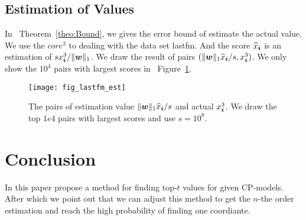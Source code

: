 \documentclass[letterpaper]{article}
\newcommand{\V}[1]{{\bm{{\MakeLowercase{#1}}}}}
\newcommand{\norm}[2]{\|#1\|_{#2}}
\newcommand{\Fig}[1]   {Figure~\ref{fig:#1}}
\newcommand{\Theo}[1] {Theorem~\ref{theo:#1}}
\begin{document}
\subsection{Estimation of Values}
In ~\Theo{Bound}, we gives the error bound of estimate the actual value.
We use the $core^3$ to dealing with the data set lastfm.
And the score $\widehat{x}_{\V{i}}$ is an estimation of $sx^3_{\V{i}}/\norm{\V{w}}{1}$.
We draw the result of pairs $(\norm{\V{w}}{1}\widehat{x}_{\V{i}}/s,x^3_{\V{i}})$.
We only show the $10^4$ pairs with largest scores in ~\Fig{Est}.
\begin{figure}[ht]
  \centering
  \texttt{[image: fig\_lastfm\_est]}\\
  \caption{The pairs of estimation value $\norm{\V{w}}{1}\widehat{x}_{\V{i}}/s$ and actual $x^3_{\V{i}}$.
           We draw the top $1e4$ pairs with largest scores and use $s=10^8$.}
  \label{fig:Est}
\end{figure}
\section{Conclusion}
In this paper propose a method for finding top-$t$ values for given CP-models.
After which we point out that we can adjust this method to get the $n$-the order estimation
and reach the high probability of finding one coordiante.


\end{document}
